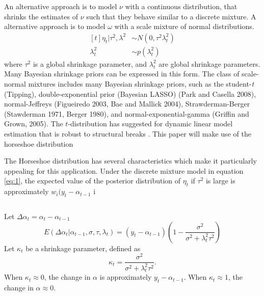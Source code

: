\documentclass{article}
\begin{document}
An alternative approach is to model $\nu$ with a continuous distribution, that shrinks the estimates of $\nu$ such that they behave similar to a discrete mixture.
A alternative approach is to model $\omega$ with a scale mixture of normal distributions.
\begin{equation}
  \label{eq:6}
  \begin{aligned}[t]
    \eta_{t} | \tau^{2}, \lambda^{2} & \sim N(0, \tau^{2} \lambda_{t}^{2}) \\
    \lambda_{t}^{2} & \sim p(\lambda^{2}_{t})
  \end{aligned}
\end{equation}
where $\tau^{2}$ is a global shrinkage parameter, and $\lambda_{t}^{2}$ are global shrinkage parameters.
Many Bayesian shrinkage priors can be expressed in this form. 
The class of scale-normal mixtures includes many Bayesian shrinkage priors, such as the student-\textit{t} (Tipping), double-exponential prior (Bayesian LASSO) (Park  and Casella 2008), normal-Jeffreys (Figueiredo 2003, Bae and Mallick 2004), Strawderman-Berger (Stawderman 1971, Berger 1980), and normal-exponential-gamma (Griffin and Grown, 2005).
The $t$-distribution has suggested for dynamic linear model estimation that is robust to structural breaks \parencites{HarveyKoopman2000}{PetrisPetroneEtAl2009}. 
This paper will make use of the horseshoe distribution 

The Horseshoe distribution has several characteristics which make it particularly appealing for this application.
Under the discrete mixture model in equation \eqref{eq:1}, the expected value of the posterior distribution of $\eta_{t}$ if $\tau^{2}$ is large is approximately $w_{i} (y_{t} - \alpha_{t-1}$ i
\begin{equation}
  \label{eq:18}
\end{equation}

\begin{equation}
  \label{eq:17}
\end{equation}

Let $\Delta \alpha_{t} = \alpha_{t} - \alpha_{t - 1}$
\begin{equation}
  \label{eq:10}
  E(\Delta \alpha_{t} | \alpha_{t - 1}, \sigma, \tau, \lambda_{t}) = (y_{t} - \alpha_{t - 1})
  \left(
    1 - \frac{\sigma^{2}}{\sigma^{2} + \lambda^{2}_{t} \tau^{2}}
  \right)
\end{equation}
Let $\kappa_{t}$ be a shrinkage parameter, defined as
\begin{equation}
  \label{eq:3}
  \kappa_{t} = \frac{\sigma^{2}}{\sigma^{2} + \lambda^{2}_{t} \tau^{2}} \text{.}
\end{equation}
When $\kappa_{t} \approx 0$, the change in $\alpha$ is approximately $y_{t} - \alpha_{t-1}$.
When $\kappa_{t} \approx 1$, the change in $\alpha \approx 0$.
\end{document}
